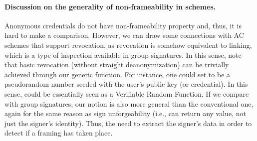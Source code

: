 \paragraph{Discussion on the generality of non-frameability in \UAS schemes.} %
Anonymous credentials do not have non-frameability property and, thus, it is
hard to make a comparison. However, we can draw some connections with AC schemes
that support revocation, as revocation is somehow equivalent to linking, which
is a type of inspection available in group signatures. In this sense, note that
basic revocation (without straight deanonymization) can be trivially achieved
through our generic \Open function. For instance, one could set \finsp to
be a pseudorandom number seeded with the user's public key (or credential). In
this sense, \Open could be essentially seen as a Verifiable Random Function.
If we compare with group signatures, our notion is also more general than the
conventional one, again for the same reason as sign unforgeability (i.e., \Open
can return any value, not just the signer's identity). Thus, the need to extract
the signer's data in order to detect if a framing has taken place.
  
